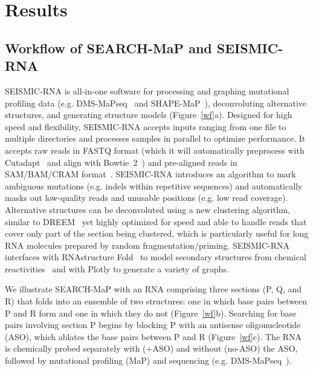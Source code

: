 \documentclass[main.tex]{subfiles}
\begin{document}
\section{Results}

\subsection{Workflow of SEARCH-MaP and SEISMIC-RNA}


SEISMIC-RNA is all-in-one software for processing and graphing mutational profiling data (e.g. DMS-MaPseq~\cite{Zubradt2016} and SHAPE-MaP~\cite{Siegfried2014}), deconvoluting alternative structures, and generating structure models (Figure~\ref{wf}a).
Designed for high speed and flexibility, SEISMIC-RNA accepts inputs ranging from one file to multiple directories and processes samples in parallel to optimize performance.
It accepts raw reads in FASTQ format (which it will automatically preprocess with Cutadapt~\cite{Martin2011} and align with Bowtie~2~\cite{Langmead2012}) and pre-aligned reads in SAM/BAM/CRAM format~\cite{Li2009}.
SEISMIC-RNA introduces an algorithm to mark ambiguous mutations (e.g. indels within repetitive sequences) and automatically masks out low-quality reads and unusable positions (e.g. low read coverage).
Alternative structures can be deconvoluted using a new clustering algorithm, similar to DREEM~\cite{Tomezsko} yet highly optimized for speed and able to handle reads that cover only part of the section being clustered, which is particularly useful for long RNA molecules prepared by random fragmentation/priming.
SEISMIC-RNA interfaces with RNAstructure Fold~\cite{Reuter2010} to model secondary structures from chemical reactivities~\cite{Cordero2012} and with Plotly to generate a variety of graphs.

We illustrate SEARCH-MaP with an RNA comprising three sections (P, Q, and R) that folds into an ensemble of two structures: one in which base pairs between P and R form and one in which they do not (Figure~\ref{wf}b).
Searching for base pairs involving section P begins by blocking P with an antisense oligonucleotide (ASO), which ablates the base pairs between P and R (Figure~\ref{wf}c).
The RNA is chemically probed separately with (+ASO) and without (no-ASO) the ASO, followed by mutational profiling (MaP) and sequencing (e.g. DMS-MaPseq~\cite{Zubradt2016}).
\end{document}
